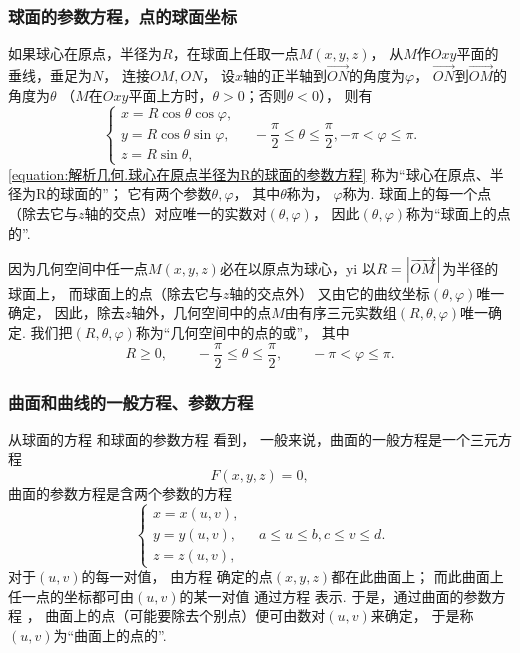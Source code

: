 \subsubsection{球面的参数方程，点的球面坐标}
如果球心在原点，半径为\(R\)，在球面上任取一点\(M(x,y,z)\)，
从\(M\)作\(Oxy\)平面的垂线，垂足为\(N\)，
连接\(OM,ON\)，
设\(x\)轴的正半轴到\(\vec{ON}\)的角度为\(\varphi\)，
\(\vec{ON}\)到\(\vec{OM}\)的角度为\(\theta\)
（\(M\)在\(Oxy\)平面上方时，\(\theta>0\)；否则\(\theta<0\)），
则有
\begin{equation}\label{equation:解析几何.球心在原点半径为R的球面的参数方程}
	\left\{ \begin{array}{l}
		x = R \cos\theta \cos\varphi, \\
		y = R \cos\theta \sin\varphi, \\
		z = R \sin\theta,
	\end{array} \right.
	\quad
	-\frac{\pi}{2} \leq \theta \leq \frac{\pi}{2},
	-\pi < \varphi \leq \pi.
\end{equation}
\cref{equation:解析几何.球心在原点半径为R的球面的参数方程}
称为“球心在原点、半径为R的球面的”；
它有两个参数\(\theta,\varphi\)，
其中\(\theta\)称为，
\(\varphi\)称为.
球面上的每一个点（除去它与\(z\)轴的交点）对应唯一的实数对\((\theta,\varphi)\)，
因此\((\theta,\varphi)\)称为“球面上的点的”.

因为几何空间中任一点\(M(x,y,z)\)必在以原点为球心，yi
以\(R=\abs{\overrightarrow{OM}}\)为半径的球面上，
而球面上的点（除去它与\(z\)轴的交点外）
又由它的曲纹坐标\((\theta,\varphi)\)唯一确定，
因此，除去\(z\)轴外，几何空间中的点\(M\)由有序三元实数组\((R,\theta,\varphi)\)唯一确定.
我们把\((R,\theta,\varphi)\)称为“几何空间中的点的或”，
其中\[
	R \geq 0,
	\qquad
	-\frac{\pi}{2} \leq \theta \leq \frac{\pi}{2},
	\qquad
	-\pi < \varphi \leq \pi.
\]

\subsubsection{曲面和曲线的一般方程、参数方程}
从球面的方程 
和球面的参数方程  看到，
一般来说，曲面的一般方程是一个三元方程\[
	F(x,y,z) = 0,
\]
曲面的参数方程是含两个参数的方程
\begin{equation}\label{equation:解析几何.曲面的参数方程}
	\left\{ \begin{array}{l}
		x = x(u,v), \\
		y = y(u,v), \\
		z = z(u,v),
	\end{array} \right.
	\quad
	a \leq u \leq b,
	c \leq v \leq d.
\end{equation}
对于\((u,v)\)的每一对值，
由方程  确定的点\((x,y,z)\)都在此曲面上；
而此曲面上任一点的坐标都可由\((u,v)\)的某一对值
通过方程  表示.
于是，通过曲面的参数方程 ，
曲面上的点（可能要除去个别点）便可由数对\((u,v)\)来确定，
于是称\((u,v)\)为“曲面上的点的”.


